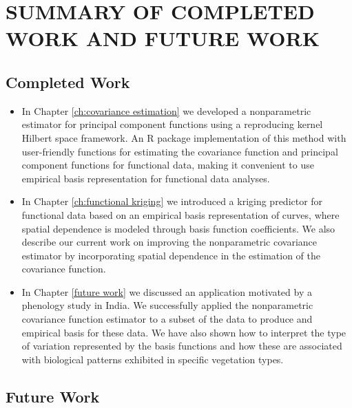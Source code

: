 
\chapter{SUMMARY OF COMPLETED WORK AND FUTURE WORK}

\section{Completed Work}

\begin{itemize}
\item In Chapter \ref{ch:covariance estimation} we developed a nonparametric estimator for principal component functions using a reproducing kernel Hilbert space framework. An R package implementation of this method with user-friendly functions for estimating the covariance function and principal component functions for functional data, making it convenient to use empirical basis representation for functional data analyses. 

\item In Chapter \ref{ch:functional kriging} we introduced a kriging predictor for functional data based on an empirical basis representation of curves, where spatial dependence is modeled through basis function coefficients. We also describe our current work on improving the nonparametric covariance estimator by incorporating spatial dependence in the estimation of the covariance function. 

\item  In Chapter \ref{future work} we discussed an application motivated by a phenology study in India. We successfully applied the nonparametric covariance function estimator to a subset of the data to produce and empirical basis for these data. We have also shown how to interpret the type of variation represented by the basis functions and how these are associated with biological patterns exhibited in specific vegetation types. 

\end{itemize}

\section{Future Work}

